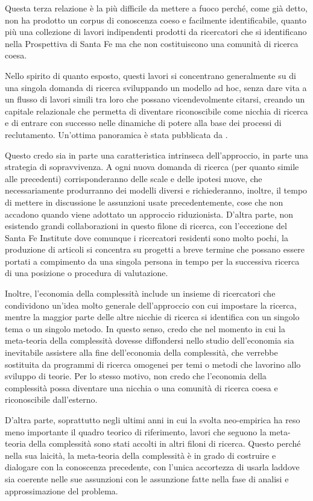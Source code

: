 \documentclass[a4paper, headings=standardclasses]{scrartcl}
\begin{document}
Questa terza relazione è la più difficile da mettere a fuoco perché, come già detto, non ha prodotto un corpus di conoscenza coeso e facilmente identificabile, quanto più una collezione di lavori indipendenti prodotti da ricercatori che si identificano nella Prospettiva di Santa Fe ma che non costituiscono una comunità di ricerca coesa.

Nello spirito di quanto esposto, questi lavori si concentrano generalmente su di una singola domanda di ricerca sviluppando un modello ad hoc, senza dare vita a un flusso di lavori simili tra loro che possano vicendevolmente citarsi, creando un capitale relazionale che permetta di diventare riconoscibile come nicchia di ricerca e di entrare con successo nelle dinamiche di potere alla base dei processi di reclutamento. Un'ottima panoramica è stata pubblicata da \textcite{arthur2021}.

Questo credo sia in parte una caratteristica intrinseca dell'approccio, in parte una strategia di sopravvivenza.
A ogni nuova domanda di ricerca (per quanto simile alle precedenti) corrisponderanno delle scale e delle ipotesi nuove, che necessariamente produrranno dei modelli diversi e richiederanno, inoltre, il tempo di mettere in discussione le assunzioni usate precedentemente, cose che non accadono quando viene adottato un approccio riduzionista.
D'altra parte, non esistendo grandi collaborazioni in questo filone di ricerca, con l'eccezione del Santa Fe Institute dove comunque i ricercatori residenti sono molto pochi, la produzione di articoli si concentra su progetti a breve termine che possano essere portati a compimento da una singola persona in tempo per la successiva ricerca di una posizione o procedura di valutazione.

Inoltre, l'economia della complessità include un insieme di ricercatori che condividono un'idea molto generale dell'approccio con cui impostare la ricerca, mentre la maggior parte delle altre nicchie di ricerca si identifica con un singolo tema o un singolo metodo.
In questo senso, credo che nel momento in cui la meta-teoria della complessità dovesse diffondersi nello studio dell'economia sia inevitabile assistere alla fine dell'economia della complessità, che verrebbe sostituita da programmi di ricerca omogenei per temi o metodi che lavorino allo sviluppo di teorie.
Per lo stesso motivo, non credo che l'economia della complessità possa diventare una nicchia o una comunità di ricerca coesa e riconoscibile dall'esterno.

D'altra parte, soprattutto negli ultimi anni in cui la svolta neo-empirica ha reso meno importante il quadro teorico di riferimento, lavori che seguono la meta-teoria della complessità sono stati accolti in altri filoni di ricerca.
Questo perché nella sua laicità, la meta-teoria della complessità è in grado di costruire e dialogare con la conoscenza precedente, con l'unica accortezza di usarla laddove sia coerente nelle sue assunzioni con le assunzione fatte nella fase di analisi e approssimazione del problema.
\end{document}
